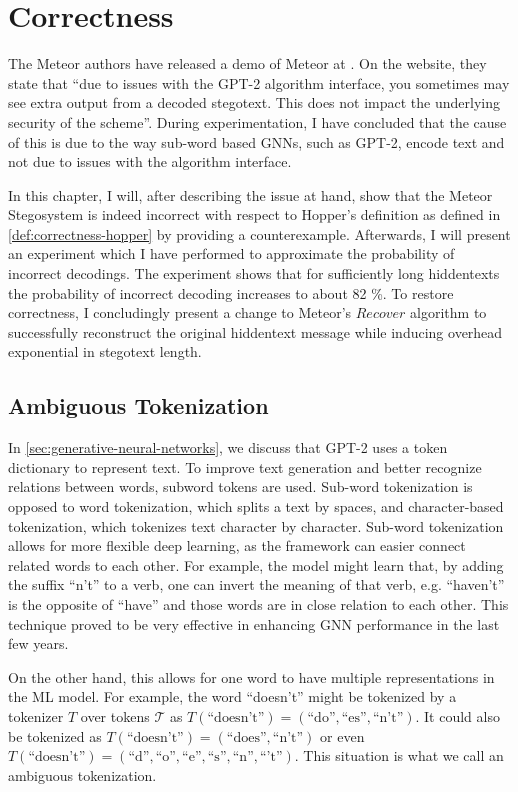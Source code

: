 \chapter{Correctness}
\label{chap:correctness}

The Meteor authors have released a demo of Meteor at \cite{MeteorDemo2021}. On the website, they state that ``due to issues with the GPT-2 algorithm interface, you sometimes may see extra output from a decoded stegotext. This does not impact the underlying security of the scheme''.
During experimentation, I have concluded that the cause of this is due to the way sub-word based GNNs, such as GPT-2, encode text and not due to issues with the algorithm interface.

In this chapter, I will, after describing the issue at hand, show that the Meteor Stegosystem is indeed incorrect with respect to Hopper's definition as defined in \autoref{def:correctness-hopper} by providing a counterexample.
Afterwards, I will present an experiment which I have performed to approximate the probability of incorrect decodings.
The experiment shows that for sufficiently long hiddentexts the probability of incorrect decoding increases to about 82 \%.
To restore correctness, I concludingly present a change to Meteor's $Recover$ algorithm to successfully reconstruct the original hiddentext message while inducing overhead exponential in stegotext length.

\section{Ambiguous Tokenization}

In \autoref{sec:generative-neural-networks}, we discuss that GPT-2 uses a token dictionary to represent text.
To improve text generation and better recognize relations between words, subword tokens are used.
Sub-word tokenization is opposed to word tokenization, which splits a text by spaces, and character-based tokenization, which tokenizes text character by character.
Sub-word tokenization allows for more flexible deep learning, as the framework can easier connect related words to each other. 
For example, the model might learn that, by adding the suffix ``n't'' to a verb, one can invert the meaning of that verb, e.g. ``haven't'' is the opposite of ``have'' and those words are in close relation to each other.
This technique proved to be very effective in enhancing GNN performance in the last few years.

On the other hand, this allows for one word to have multiple representations in the ML model.
For example, the word ``doesn't'' might be tokenized by a tokenizer $T$ over tokens $\mathcal{T}$ as $T(\textrm{``doesn't''}) = ( \textrm{``do''}, \textrm{``es''}, \textrm{``n't''} )$.
It could also be tokenized as $T(\textrm{``doesn't''}) = ( \textrm{``does''}, \textrm{``n't''} )$ or even $T(\textrm{``doesn't''}) = ( \textrm{``d''}, \textrm{``o''}, \textrm{``e''}, \textrm{``s''}, \textrm{``n''}, \textrm{``'t''})$.
This situation is what we call an ambiguous tokenization.

